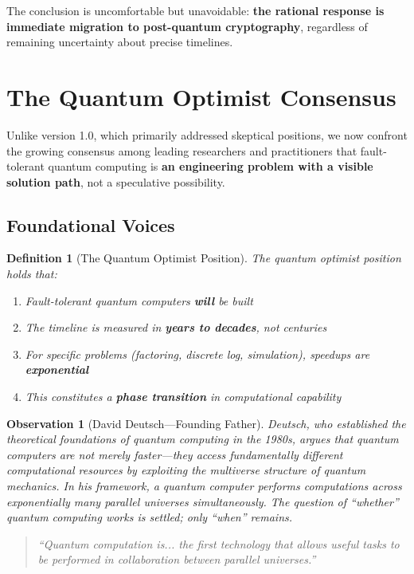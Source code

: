\documentclass[11pt,a4paper]{article}
\newtheorem{definition}[theorem]{Definition}
\newtheorem{observation}[theorem]{Observation}
\begin{document}
The conclusion is uncomfortable but unavoidable: \textbf{the rational response is immediate migration to post-quantum cryptography}, regardless of remaining uncertainty about precise timelines.

\section{The Quantum Optimist Consensus}

Unlike version 1.0, which primarily addressed skeptical positions, we now confront the growing consensus among leading researchers and practitioners that fault-tolerant quantum computing is \textbf{an engineering problem with a visible solution path}, not a speculative possibility.

\subsection{Foundational Voices}

\begin{definition}[The Quantum Optimist Position]
The quantum optimist position holds that:
\begin{enumerate}[noitemsep]
    \item Fault-tolerant quantum computers \textbf{will} be built
    \item The timeline is measured in \textbf{years to decades}, not centuries
    \item For specific problems (factoring, discrete log, simulation), speedups are \textbf{exponential}
    \item This constitutes a \textbf{phase transition} in computational capability
\end{enumerate}
\end{definition}

\begin{observation}[David Deutsch---Founding Father]
Deutsch, who established the theoretical foundations of quantum computing in the 1980s, argues that quantum computers are not merely faster---they access fundamentally different computational resources by exploiting the multiverse structure of quantum mechanics. In his framework, a quantum computer performs computations across exponentially many parallel universes simultaneously. The question of ``whether'' quantum computing works is settled; only ``when'' remains.

\begin{quote}
\textit{``Quantum computation is... the first technology that allows useful tasks to be performed in collaboration between parallel universes.''}
\end{quote}
\end{observation}
\end{document}
